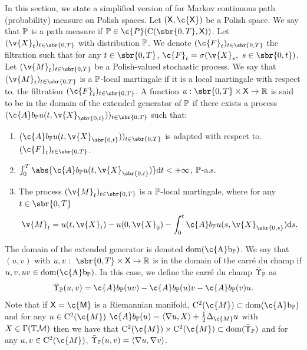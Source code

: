 In this section, we state a simplified version of \textcite[Theorem 3.17]{cattiaux2021time} for Markov continuous path (probability) measure on Polish spaces.
Let \((\sf{X}, \c{X})\) be a Polish space.
We say that \(\bb{P}\) is a path measure if \(\bb{P} \in \c{P}(\mathrm{C}(\sbr{0,T}, \sf{X}))\).
Let \((\v{X}_t)_{t \in \sbr{0,T}}\) with distribution \(\bb{P}\).
We denote \((\c{F}_t)_{t \in \sbr{0,T}}\) the filtration such that for any \(t \in \sbr{0,T}\), \(\c{F}_t = \sigma(\v{X}_s, \ s \in \sbr{0,t})\).
Let \((\v{M}_t)_{t \in \sbr{0,T}}\) be a Polish-valued stochastic process.
We say that \((\v{M}_t)_{t \in \sbr{0,T}}\) is a \(\bb{P}\)-local martingale if it is a local martingale with respect to.
the filtration \((\c{F}_t)_{t \in \sbr{0,T}}\).
A function \(u: \sbr{0,T} \times \sf{X} \to \R\) is said to be in the domain of the extended generator of \(\bb{P}\) if there exists a process \((\c{A} b_{\bb{P}} u(t, \v{X}_{\sbr{0,t}}))_{t \in \sbr{0,T}}\) such that: \begin{enumerate}[label= (\alph*), wide, labelindent=0pt] \item \((\c{A}b_{\bb{P}} u(t, \v{X}_{\sbr{0,t}}))_{t \in \sbr{0,T}}\) is adapted with respect to.
	      \((\c{F}_t)_{t \in \sbr{0,T}}\).
	\item \(\int_0^T \abs{\c{A}b_{\bb{P}} u(t, \v{X}_{\sbr{0,t}})} \mathrm{d} t < +\infty\), \(\bb{P}\)-a.s.
	\item The process \((\v{M}_t)_{t \in \sbr{0,T}}\) is a \(\bb{P}\)-local martingale,
	      where for any \(t \in \sbr{0,T}\)
	      \begin{equation}
		      {\v{M}_t = u(t,\v{X}_t) - u(0, \v{X}_0) - \int_0^t \c{A}b_{\bb{P}} u(s, \v{X}_{\sbr{0,s}}) \mathrm{d} s   .}
	      \end{equation}
\end{enumerate}
The domain of the extended generator is denoted \(\rm{dom}(\c{A}b_{\bb{P}})\).
We say that \((u,v)\) with \(u,v : \ \sbr{0,T} \times \sf{X} \to \R\) is in the domain of the carr\'e du champ if \(u,v, uv \in \rm{dom}(\c{A}b_{\bb{P}})\).
In this case, we define the carr\'e du champ \(\bar{\carrechamp}_{\bb{P}}\) as \begin{equation} \bar{\carrechamp}_{\bb{P}}(u,v) = \c{A}b_{\bb{P}}(uv) - \c{A}b_{\bb{P}}(u)v - \c{A}b_{\bb{P}}(v)u .
\end{equation}
Note that if \(\sf{X} = \c{M}\) is a Riemannian manifold, \(\mathrm{C}^2(\c{M}) \subset \rm{dom}(\c{A}b_{\bb{P}})\) and for any \(u \in \mathrm{C}^2(\c{M})\) \(\c{A}b_{\bb{P}}(u) = \langle \nabla u, X \rangle + \tfrac{1}{2}\Delta_\c{M} u\) with \(X \in \Gamma(\mathrm{T}\mathcal{M})\) then we have that \(\mathrm{C}^2(\c{M}) \times \mathrm{C}^2(\c{M}) \subset \rm{dom}(\bar{\carrechamp}_{\bb{P}})\) and for any \(u, v \in \mathrm{C}^2(\c{M})\), \(\bar{\carrechamp}_{\bb{P}}(u,v) = \langle \nabla u, \nabla v \rangle\).
